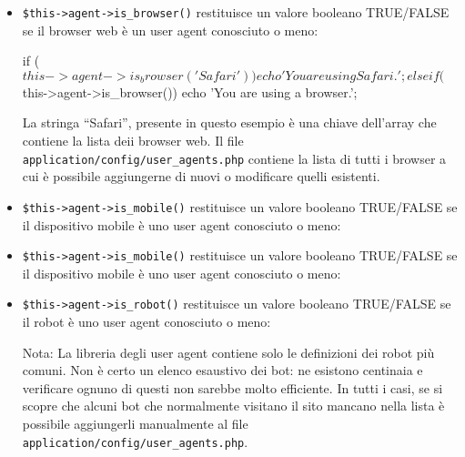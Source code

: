 \begin{itemize}
\item \verb|$this->agent->is_browser()| restituisce un valore booleano TRUE/FALSE se il browser web è un user agent conosciuto o meno:

\begin{code}
if ($this->agent->is_browser('Safari'))
{
    echo 'You are using Safari.';
}
else if ($this->agent->is_browser())
{
    echo 'You are using a browser.';
}
\end{code}

La stringa ``Safari'', presente in questo esempio è una chiave dell'array che contiene la lista deii browser web. Il file \verb|application/config/user_agents.php| contiene la lista di tutti i browser a cui è possibile aggiungerne di nuovi o modificare quelli esistenti.

\item \verb|$this->agent->is_mobile()| restituisce un valore booleano TRUE/FALSE se il dispositivo mobile è uno user agent conosciuto o meno:


\item \verb|$this->agent->is_mobile()| restituisce un valore booleano TRUE/FALSE se il dispositivo mobile è uno user agent conosciuto o meno:


\item \verb|$this->agent->is_robot()| restituisce un valore booleano TRUE/FALSE se il robot è uno user agent conosciuto o meno:

Nota: La libreria degli user agent contiene solo le definizioni dei robot più comuni. Non è certo un elenco esaustivo dei bot: ne esistono centinaia e verificare ognuno di questi non sarebbe molto efficiente. In tutti i casi, se si scopre che alcuni bot che normalmente visitano il sito mancano nella lista è possibile aggiungerli manualmente al file \verb|application/config/user_agents.php|.


\end{itemize}
